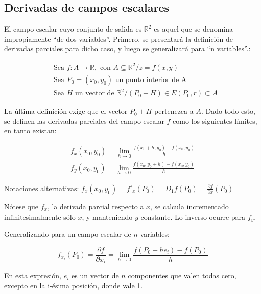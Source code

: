 \documentclass{article}
\renewcommand{\Bbb}{\mathbb}
\begin{document}
\subsection{Derivadas de campos escalares}

El campo escalar cuyo conjunto de salida es $\Bbb R^2$ es aquel que se denomina impropiamente ``de dos variables''. Primero, se presentará la definición de derivadas parciales para dicho caso, y luego se generalizará para ``n variables''.:

\begin{subequations}
\begin{align}
& \text{Sea } f: A \rightarrow \Bbb R, \text{ con } A \subseteq \Bbb R^2 / z = f(x,y) \\
& \text{Sea } P_0 = (x_0, y_0) \text{ un punto interior de A} \\
& \text{Sea } H \text{ un vector de } \Bbb R^2 / (P_0 + H) \in E(P_0, r) \subset A
\end{align}
\end{subequations}

La última definición exige que el vector $P_0 + H$ pertenezca a $A$. Dado todo esto, se definen las derivadas parciales del campo escalar $f$ como los siguientes límites, en tanto existan:

\begin{subequations}
\begin{align}
f_x(x_0, y_0) = \lim_{h \rightarrow 0} \frac{f(x_0 + h, y_0) - f(x_0, y_0)}{h} \\
f_y(x_0, y_0) = \lim_{h \rightarrow 0} \frac{f(x_0, y_0 + h) - f(x_0, y_0)}{h}
\end{align}
\end{subequations}

Notaciones alternativas: $f_x(x_0, y_0) = f'_x(P_0) = D_1 f(P_0) = \frac{\partial f}{\partial x} (P_0)$

Nótese que $f_x$, la derivada parcial respecto a $x$, se calcula incrementado infinitesimalmente sólo $x$, y manteniendo $y$ constante. Lo inverso ocurre para $f_y$.

Generalizando para un campo escalar de $n$ variables:

\begin{equation}
f_{x_i}(P_0) = \frac{\partial f}{\partial x_i} = \lim_{h \rightarrow 0} \frac{f(P_0 + h e_i) - f(P_0)}{h}
\end{equation}

En esta expresión, $e_i$ es un vector de $n$ componentes que valen todas cero, excepto en la i-ésima posición, donde vale 1.
\end{document}
